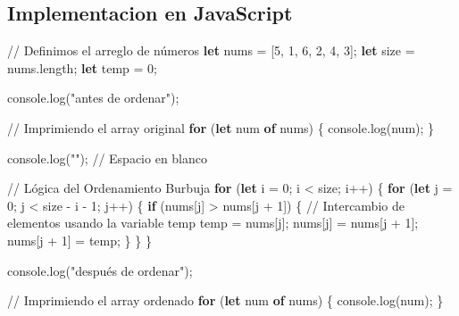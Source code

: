 \documentclass[
  spanish,
  letterpaper,
  DIV=11,
  numbers=noendperiod]{scrreprt}
\newenvironment{Shaded}{\begin{snugshade}}{\end{snugshade}}
\newcommand{\AttributeTok}[1]{\textcolor[rgb]{0.40,0.45,0.13}{#1}}
\newcommand{\BuiltInTok}[1]{\textcolor[rgb]{0.00,0.23,0.31}{#1}}
\newcommand{\CommentTok}[1]{\textcolor[rgb]{0.37,0.37,0.37}{#1}}
\newcommand{\ControlFlowTok}[1]{\textcolor[rgb]{0.00,0.23,0.31}{\textbf{#1}}}
\newcommand{\DecValTok}[1]{\textcolor[rgb]{0.68,0.00,0.00}{#1}}
\newcommand{\FunctionTok}[1]{\textcolor[rgb]{0.28,0.35,0.67}{#1}}
\newcommand{\KeywordTok}[1]{\textcolor[rgb]{0.00,0.23,0.31}{\textbf{#1}}}
\newcommand{\NormalTok}[1]{\textcolor[rgb]{0.00,0.23,0.31}{#1}}
\newcommand{\OperatorTok}[1]{\textcolor[rgb]{0.37,0.37,0.37}{#1}}
\newcommand{\StringTok}[1]{\textcolor[rgb]{0.13,0.47,0.30}{#1}}
\begin{document}
\subsection{Implementacion en
JavaScript}\label{implementacion-en-javascript}

\begin{Shaded}
\begin{Highlighting}[]
\CommentTok{// Definimos el arreglo de números}
\KeywordTok{let}\NormalTok{ nums }\OperatorTok{=}\NormalTok{ [}\DecValTok{5}\OperatorTok{,} \DecValTok{1}\OperatorTok{,} \DecValTok{6}\OperatorTok{,} \DecValTok{2}\OperatorTok{,} \DecValTok{4}\OperatorTok{,} \DecValTok{3}\NormalTok{]}\OperatorTok{;}
\KeywordTok{let}\NormalTok{ size }\OperatorTok{=}\NormalTok{ nums}\OperatorTok{.}\AttributeTok{length}\OperatorTok{;}
\KeywordTok{let}\NormalTok{ temp }\OperatorTok{=} \DecValTok{0}\OperatorTok{;}

\BuiltInTok{console}\OperatorTok{.}\FunctionTok{log}\NormalTok{(}\StringTok{"antes de ordenar"}\NormalTok{)}\OperatorTok{;}

\CommentTok{// Imprimiendo el array original}
\ControlFlowTok{for}\NormalTok{ (}\KeywordTok{let}\NormalTok{ num }\KeywordTok{of}\NormalTok{ nums) \{}
    \BuiltInTok{console}\OperatorTok{.}\FunctionTok{log}\NormalTok{(num)}\OperatorTok{;}
\NormalTok{\}}

\BuiltInTok{console}\OperatorTok{.}\FunctionTok{log}\NormalTok{(}\StringTok{""}\NormalTok{)}\OperatorTok{;} \CommentTok{// Espacio en blanco}

\CommentTok{// Lógica del Ordenamiento Burbuja}
\ControlFlowTok{for}\NormalTok{ (}\KeywordTok{let}\NormalTok{ i }\OperatorTok{=} \DecValTok{0}\OperatorTok{;}\NormalTok{ i }\OperatorTok{\textless{}}\NormalTok{ size}\OperatorTok{;}\NormalTok{ i}\OperatorTok{++}\NormalTok{) \{}
    \ControlFlowTok{for}\NormalTok{ (}\KeywordTok{let}\NormalTok{ j }\OperatorTok{=} \DecValTok{0}\OperatorTok{;}\NormalTok{ j }\OperatorTok{\textless{}}\NormalTok{ size }\OperatorTok{{-}}\NormalTok{ i }\OperatorTok{{-}} \DecValTok{1}\OperatorTok{;}\NormalTok{ j}\OperatorTok{++}\NormalTok{) \{}
        \ControlFlowTok{if}\NormalTok{ (nums[j] }\OperatorTok{\textgreater{}}\NormalTok{ nums[j }\OperatorTok{+} \DecValTok{1}\NormalTok{]) \{}
            \CommentTok{// Intercambio de elementos usando la variable temp}
\NormalTok{            temp }\OperatorTok{=}\NormalTok{ nums[j]}\OperatorTok{;}
\NormalTok{            nums[j] }\OperatorTok{=}\NormalTok{ nums[j }\OperatorTok{+} \DecValTok{1}\NormalTok{]}\OperatorTok{;}
\NormalTok{            nums[j }\OperatorTok{+} \DecValTok{1}\NormalTok{] }\OperatorTok{=}\NormalTok{ temp}\OperatorTok{;}
\NormalTok{        \}}
\NormalTok{    \}}
\NormalTok{\}}

\BuiltInTok{console}\OperatorTok{.}\FunctionTok{log}\NormalTok{(}\StringTok{"después de ordenar"}\NormalTok{)}\OperatorTok{;}

\CommentTok{// Imprimiendo el array ordenado}
\ControlFlowTok{for}\NormalTok{ (}\KeywordTok{let}\NormalTok{ num }\KeywordTok{of}\NormalTok{ nums) \{}
    \BuiltInTok{console}\OperatorTok{.}\FunctionTok{log}\NormalTok{(num)}\OperatorTok{;}
\NormalTok{\}}
\end{Highlighting}
\end{Shaded}
\end{document}
